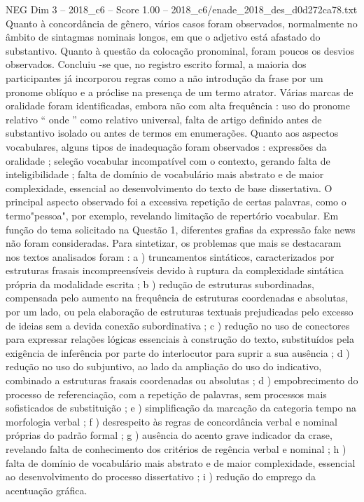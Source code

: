 \begin{textsample}{NEG Dim 3 – 2018\_c6 – Score 1.00 – 2018\_c6/enade\_2018\_des\_d0d272ca78.txt}
Quanto à concordância de gênero, vários casos foram observados, normalmente no âmbito de sintagmas nominais longos, em que o adjetivo está afastado do substantivo.
Quanto à questão da colocação pronominal, foram poucos os desvios observados.
Concluiu -se que, no registro escrito formal, a maioria dos participantes já incorporou regras como a não introdução da frase por um pronome oblíquo e a próclise na presença de um termo atrator.
Várias marcas de oralidade foram identificadas, embora não com alta frequência : uso do pronome relativo “ onde ” como relativo universal, falta de artigo definido antes de substantivo isolado ou antes de termos em enumerações.
Quanto aos aspectos vocabulares, alguns tipos de inadequação foram observados : expressões da oralidade ; seleção vocabular incompatível com o contexto, gerando falta de inteligibilidade ; falta de domínio de vocabulário mais abstrato e de maior complexidade, essencial ao desenvolvimento do texto de base dissertativa.
O principal aspecto observado foi a excessiva repetição de certas palavras, como o termo"pessoa", por exemplo, revelando limitação de repertório vocabular.
Em função do tema solicitado na Questão 1, diferentes grafias da expressão fake news não foram consideradas.
Para sintetizar, os problemas que mais se destacaram nos textos analisados foram : a ) truncamentos sintáticos, caracterizados por estruturas frasais incompreensíveis devido à ruptura da complexidade sintática própria da modalidade escrita ; b ) redução de estruturas subordinadas, compensada pelo aumento na frequência de estruturas coordenadas e absolutas, por um lado, ou pela elaboração de estruturas textuais prejudicadas pelo excesso de ideias sem a devida conexão subordinativa ; c ) redução no uso de conectores para expressar relações lógicas essenciais à construção do texto, substituídos pela exigência de inferência por parte do interlocutor para suprir a sua ausência ; d ) redução no uso do subjuntivo, ao lado da ampliação do uso do indicativo, combinado a estruturas frasais coordenadas ou absolutas ; d ) empobrecimento do processo de referenciação, com a repetição de palavras, sem processos mais sofisticados de substituição ; e ) simplificação da marcação da categoria tempo na morfologia verbal ; f ) desrespeito às regras de concordância verbal e nominal próprias do padrão formal ; g ) ausência do acento grave indicador da crase, revelando falta de conhecimento dos critérios de regência verbal e nominal ; h ) falta de domínio de vocabulário mais abstrato e de maior complexidade, essencial ao desenvolvimento do processo dissertativo ; i ) redução do emprego da acentuação gráfica.

\end{textsample}
